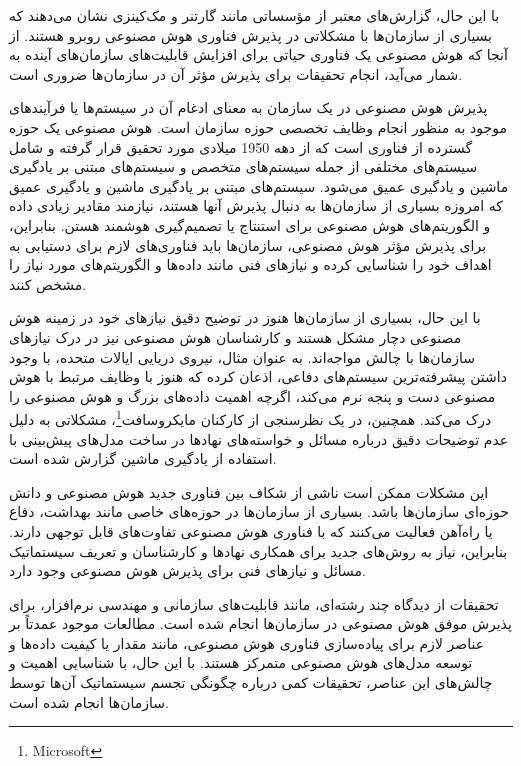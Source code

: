 \documentclass[a4paper,10pt]{article}
\begin{document}
        با این حال، گزارش‌های معتبر از مؤسساتی مانند گارتنر و مک‌کینزی نشان می‌دهند که بسیاری از سازمان‌ها با مشکلاتی در پذیرش فناوری هوش مصنوعی روبرو هستند. از آنجا که هوش مصنوعی یک فناوری حیاتی برای افزایش قابلیت‌های سازمان‌های آینده به شمار می‌آید، انجام تحقیقات برای پذیرش مؤثر آن در سازمان‌ها ضروری است.

        پذیرش هوش مصنوعی در یک سازمان به معنای ادغام آن در سیستم‌ها یا فرآیندهای موجود به منظور انجام وظایف تخصصی حوزه سازمان است. هوش مصنوعی یک حوزه گسترده از فناوری است که از دهه 1950 میلادی مورد تحقیق قرار گرفته و شامل سیستم‌های مختلفی از جمله سیستم‌های متخصص و سیستم‌های مبتنی بر یادگیری ماشین و یادگیری عمیق می‌شود. سیستم‌های مبتنی بر یادگیری ماشین و یادگیری عمیق که امروزه بسیاری از سازمان‌ها به دنبال پذیرش آنها هستند، نیازمند مقادیر زیادی داده و الگوریتم‌های هوش مصنوعی برای استنتاج یا تصمیم‌گیری هوشمند هستن. بنابراین، برای پذیرش مؤثر هوش مصنوعی، سازمان‌ها باید فناوری‌های لازم برای دستیابی به اهداف خود را شناسایی کرده و نیازهای فنی مانند داده‌ها و الگوریتم‌های مورد نیاز را مشخص کنند.

        با این حال، بسیاری از سازمان‌ها هنوز در توضیح دقیق نیازهای خود در زمینه هوش مصنوعی دچار مشکل هستند و کارشناسان هوش مصنوعی نیز در درک نیازهای سازمان‌ها با چالش مواجه‌اند. به عنوان مثال، نیروی دریایی ایالات متحده، با وجود داشتن پیشرفته‌ترین سیستم‌های دفاعی، اذعان کرده که هنوز با وظایف مرتبط با هوش مصنوعی دست و پنجه نرم می‌کند، اگرچه اهمیت داده‌های بزرگ و هوش مصنوعی را درک می‌کند. همچنین، در یک نظرسنجی از کارکنان مایکروسافت\footnote{\hspace{2pt}Microsoft}، مشکلاتی به دلیل عدم توضیحات دقیق درباره مسائل و خواسته‌های نهادها در ساخت مدل‌های پیش‌بینی با استفاده از یادگیری ماشین گزارش شده است.

        این مشکلات ممکن است ناشی از شکاف بین فناوری جدید هوش مصنوعی و دانش حوزه‌ای سازمان‌ها باشد. بسیاری از سازمان‌ها در حوزه‌های خاصی مانند بهداشت، دفاع یا راه‌آهن فعالیت می‌کنند که با فناوری هوش مصنوعی تفاوت‌های قابل توجهی دارند. بنابراین، نیاز به روش‌های جدید برای همکاری نهادها و کارشناسان و تعریف سیستماتیک مسائل و نیازهای فنی برای پذیرش هوش مصنوعی وجود دارد.

        تحقیقات از دیدگاه چند رشته‌ای، مانند قابلیت‌های سازمانی و مهندسی نرم‌افزار، برای پذیرش موفق هوش مصنوعی در سازمان‌ها انجام شده است. مطالعات موجود عمدتاً بر عناصر لازم برای پیاده‌سازی فناوری هوش مصنوعی، مانند مقدار یا کیفیت داده‌ها و توسعه مدل‌های هوش مصنوعی متمرکز هستند. با این حال، با شناسایی اهمیت و چالش‌های این عناصر، تحقیقات کمی درباره چگونگی تجسم سیستماتیک آن‌ها توسط سازمان‌ها انجام شده است.
\end{document}
